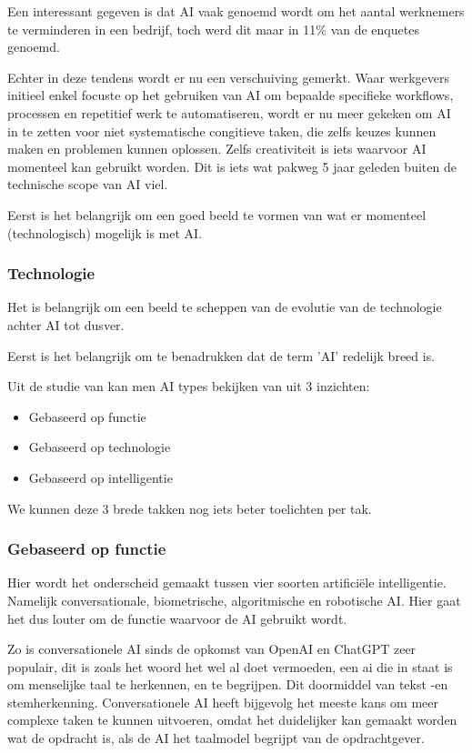 Een interessant gegeven is dat AI vaak genoemd wordt om het aantal werknemers te verminderen in een bedrijf, toch werd dit maar in 11\% van de enquetes genoemd. 

Echter in deze tendens wordt er nu een verschuiving gemerkt. Waar werkgevers initieel enkel focuste op het gebruiken van AI om bepaalde specifieke workflows, processen en repetitief werk te automatiseren, wordt er nu meer gekeken om AI in te zetten voor niet systematische congitieve taken, die zelfs keuzes kunnen maken en problemen kunnen oplossen. Zelfs creativiteit is iets waarvoor AI momenteel kan gebruikt worden. Dit is iets wat pakweg 5 jaar geleden buiten de technische scope van AI viel. 

Eerst is het belangrijk om een goed beeld te vormen van wat er momenteel (technologisch) mogelijk is met AI.

\subsubsection{Technologie}
Het is belangrijk om een beeld te scheppen van de evolutie van de technologie achter AI tot dusver.

Eerst is het belangrijk om te benadrukken dat de term 'AI' redelijk breed is.

Uit de studie van \cite{benbya2020artificial} kan men AI types bekijken van uit 3 inzichten:
\begin{itemize}
    \item Gebaseerd op functie
    \item Gebaseerd op technologie
    \item Gebaseerd op intelligentie
\end{itemize}

We kunnen deze 3 brede takken nog iets beter toelichten per tak.

\subsubsection{Gebaseerd op functie}

    Hier wordt het onderscheid gemaakt tussen vier soorten artificiële intelligentie. Namelijk conversationale, biometrische, algoritmische en robotische AI. Hier gaat het dus louter om de functie waarvoor de AI gebruikt wordt. 
    
    Zo is conversationele AI sinds de opkomst van OpenAI en ChatGPT zeer populair, dit is zoals het woord het wel al doet vermoeden, een ai die in staat is om menselijke taal te herkennen, en te begrijpen. Dit doormiddel van tekst -en stemherkenning. Conversationele AI heeft bijgevolg het meeste kans om meer complexe taken te kunnen uitvoeren, omdat het duidelijker kan gemaakt worden wat de opdracht is, als de AI het taalmodel begrijpt van de opdrachtgever.
    
